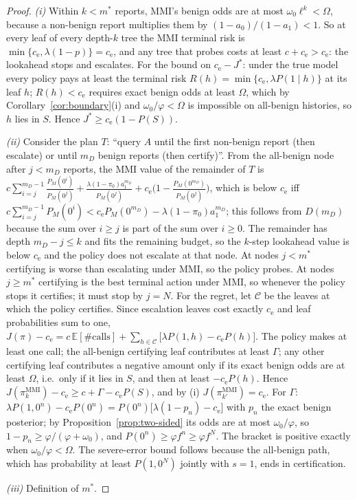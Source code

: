 \begin{proof}
\emph{(i)} Within $k<m^*$ reports, MMI's benign odds are at most $\omega_0\ell^k<\Omega$, because a non-benign report
multiplies them by $(1-a_0)/(1-a_1)<1$. So at every leaf of every depth-$k$ tree the MMI terminal risk is
$\min\{c_{\mathrm e},\lambda(1-p)\}=c_{\mathrm e}$, and any tree that probes costs at least $c+c_{\mathrm e}>c_{\mathrm e}$:
the lookahead stops and escalates. For the bound on $c_{\mathrm e}-J^*$: under the true model every policy pays at
least the terminal risk $R(h)=\min\{c_{\mathrm e},\lambda P(1\mid h)\}$ at its leaf $h$; $R(h)<c_{\mathrm e}$ requires
exact benign odds at least $\Omega$, which by Corollary~\ref{cor:boundary}(i) and $\omega_0/\varphi<\Omega$ is impossible on
all-benign histories, so $h$ lies in $S$. Hence $J^*\ge c_{\mathrm e}(1-P(S))$.

\emph{(ii)} Consider the plan $T$: ``query $A$ until the first non-benign report (then escalate) or until $m_D$ benign
reports (then certify)''. From the all-benign node after $j<m_D$ reports, the MMI value of the remainder of $T$ is
$c\sum_{i=j}^{m_D-1}\frac{P_M(0^i)}{P_M(0^j)}+\frac{\lambda(1-\pi_0)a_1^{m_D}}{P_M(0^j)}
+c_{\mathrm e}\Big(1-\frac{P_M(0^{m_D})}{P_M(0^j)}\Big)$, which is below $c_{\mathrm e}$ iff
$c\sum_{i=j}^{m_D-1}P_M(0^i)<c_{\mathrm e}P_M(0^{m_D})-\lambda(1-\pi_0)a_1^{m_D}$; this follows from $D(m_D)$ because the sum
over $i\ge j$ is part of the sum over $i\ge0$. The remainder has depth $m_D-j\le k$ and fits the remaining budget, so
the $k$-step lookahead value is below $c_{\mathrm e}$ and the policy does not escalate at that node. At nodes $j<m^*$
certifying is worse than escalating under MMI, so the policy probes. At nodes $j\ge m^*$ certifying is the best terminal
action under MMI, so whenever the policy stops it certifies; it must stop by $j=N$.
For the regret, let $\mathcal C$ be the leaves at which the policy certifies. Since escalation leaves cost exactly
$c_{\mathrm e}$ and leaf probabilities sum to one,
$J(\pi)-c_{\mathrm e}=c\,\mathbb E[\#\text{calls}]+\sum_{h\in\mathcal C}\big[\lambda P(1,h)-c_{\mathrm e}P(h)\big]$.
The policy makes at least one call; the all-benign certifying leaf contributes at least $\Gamma$; any other certifying
leaf contributes a negative amount only if its exact benign odds are at least $\Omega$, i.e.\ only if it lies in $S$,
and then at least $-c_{\mathrm e}P(h)$. Hence $J(\pi^{\mathrm{MMI}}_k)-c_{\mathrm e}\ge c+\Gamma-c_{\mathrm e}P(S)$, and by (i)
$J(\pi^{\mathrm{MMI}}_{k'})=c_{\mathrm e}$. For $\Gamma$: $\lambda P(1,0^n)-c_{\mathrm e}P(0^n)=P(0^n)\big[\lambda(1-p_n)-c_{\mathrm e}\big]$
with $p_n$ the exact benign posterior; by Proposition~\ref{prop:two-sided} its odds are at most $\omega_0/\varphi$, so
$1-p_n\ge\varphi/(\varphi+\omega_0)$, and $P(0^n)\ge\varphi f^n\ge\varphi f^N$. The bracket is positive exactly when
$\omega_0/\varphi<\Omega$. The severe-error bound follows because the all-benign path, which has probability at least
$P(1,0^N)$ jointly with $s=1$, ends in certification.

\emph{(iii)} Definition of $m^*$.
\end{proof}

